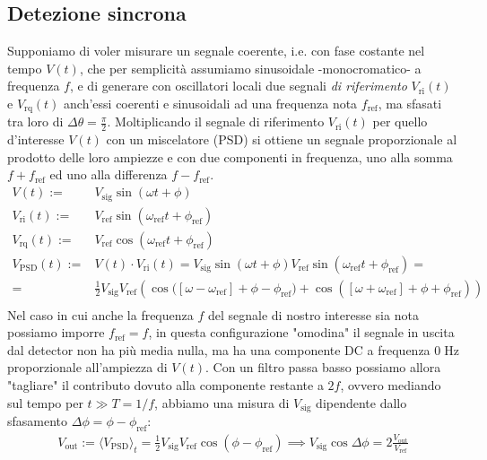 \documentclass{article}[a4paper, oneside, 11pt]
\begin{document}
\subsection{Detezione sincrona}
Supponiamo di voler misurare un segnale coerente, i.e. con fase costante
nel tempo $V(t)$, che per semplicità assumiamo sinusoidale -monocromatico- a
frequenza $f$, e di generare con oscillatori locali due segnali
\emph{di riferimento} $V_{\text{ri}} (t)$ e $V_{\text{rq}} (t)$ anch'essi
coerenti e sinusoidali ad una frequenza nota $f_{\text{ref}}$, ma sfasati tra
loro di $\Delta \theta = \frac{\pi}{2}$.
Moltiplicando il segnale di riferimento
$V_{\text{ri}} (t)$ per quello d'interesse $V(t)$ con un miscelatore (PSD)
si ottiene un segnale proporzionale al prodotto delle loro ampiezze e con
due componenti in frequenza, uno alla somma $f + f_{\text{ref}}$ ed uno
alla differenza $f - f_{\text{ref}}$.
\begin{align*}
	V(t) :=& V_{\text{sig}}\sin{(\omega t + \phi)} \\
	V_{\text{ri}}(t) :=& V_{\text{ref}}\sin{(\omega_{\text{ref}}t + \phi_{\text{ref}})} \\
	V_{\text{rq}}(t) :=& V_{\text{ref}}\cos{(\omega_{\text{ref}}t + \phi_{\text{ref}})} \\
	V_{\text{PSD}}(t) :=& V(t) \cdot V_{\text{ri}}(t) =
	V_{\text{sig}}\sin{(\omega t + \phi)} 
	V_{\text{ref}}\sin{(\omega_{\text{ref}}t + \phi_{\text{ref}})} = \\
	=& \frac{1}{2} V_{\text{sig}} V_{\text{ref}} \left(\cos{([\omega - 
		\omega_{\text{ref}}] + \phi - \phi_{\text{ref}}}) + 
	\cos{([\omega + \omega_{\text{ref}}] + \phi + \phi_{\text{ref}})} \right) \\
\end{align*}
Nel caso in cui anche la frequenza $f$ del segnale di nostro interesse sia
nota possiamo imporre $f_{\text{ref}} = f$, in questa configurazione "omodina"
il segnale in uscita dal detector non ha più media nulla, ma ha una componente
DC a frequenza $0 \; \si{\hertz}$ proporzionale all'ampiezza di $V(t)$.
Con un filtro passa basso possiamo allora "tagliare" il contributo dovuto
alla componente restante a $2f$, ovvero mediando sul tempo per 
$t \gg T = 1/f$, abbiamo una misura di $V_{\text{sig}}$ dipendente dallo
sfasamento $\Delta \phi = \phi - \phi_{\text{ref}}$: 
\begin{align}
	V_{\text{out}} := \langle V_{\text{PSD}} \rangle_t 
	= \frac{1}{2} V_{\text{sig}} V_{\text{ref}}\cos{(\phi - \phi_{\text{ref}})}
	\implies V_{\text{sig}}\cos{\Delta \phi} =
	2 \frac{V_{\text{out}}}{V_{\text{ref}}}
\end{align}
\end{document}
